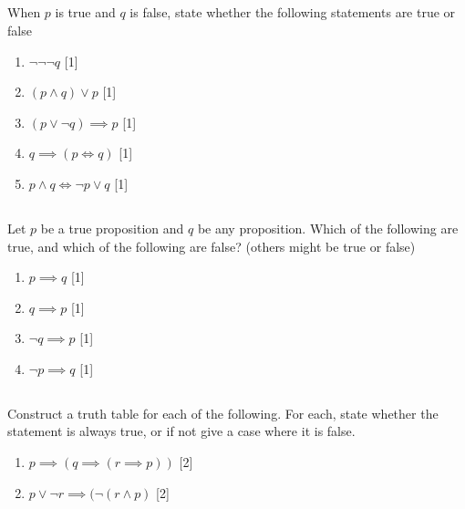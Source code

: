 \documentclass[twocolumn]{article}
\newcounter{pmarks}
\newcounter{marks}
\newcommand\mrk[1]{{\hfill\color{blue}\small[{#1}]}\addtocounter{pmarks}{#1}\addtocounter{marks}{#1}}
\begin{document}
\subsection{}

When $p$ is true and $q$ is false, state whether the following statements are true or false

\begin{enumerate}
    \item $\neg \neg \neg q$ \mrk{1}
    \item $(p \wedge q) \vee p$ \mrk{1}
    \item $(p \vee \neg q) \implies p$ \mrk{1}
    \item $q \implies (p \Longleftrightarrow q)$ \mrk{1}
    \item $p \wedge q \Longleftrightarrow \neg p \vee q$ \mrk{1}
\end{enumerate}

\subsection{}

Let $p$ be a true proposition and $q$ be any proposition. Which of the following are true, and which of the following are false? (others might be true or false)

\begin{enumerate}
    \item $p \implies q$ \mrk{1}
    \item $q \implies p$ \mrk{1}
    \item $\neg q \implies p$ \mrk{1}
    \item $\neg p \implies q$ \mrk{1}
\end{enumerate}

\subsection{}

Construct a truth table for each of the following. For each, state whether the statement is always true, or if not give a case where it is false.

\begin{enumerate}
    \item $ p \implies (q \implies ( r \implies p )) $ \mrk{2}
    \item $ p \vee \neg r \implies (\neg ( r \wedge p ) $ \mrk{2}
\end{enumerate}

\subsection{}
\end{document}
